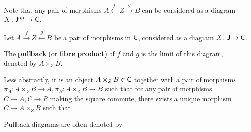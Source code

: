 \documentclass[../../main]{subfiles}
\begin{document}
Note that any pair of morphisms \(A \xleftarrow{f} Z \xrightarrow{g} B\) can be considered as a diagram \(X\colon \mathsf{J}^{\operatorname*{op}} \to \mathsf{C}\).

\begin{definition}[Pullback]\label{def:pullback}
  Let \(A \xrightarrow{f} Z \xleftarrow{g} B\) be a pair of morphisms in \(\mathsf{C}\), considered as a \hyperref[def:diagram]{diagram} \(X\colon \mathsf{J} \to \mathsf{C}\).
  
  The \textbf{pullback} (or \textbf{fibre product}) of \(f\) and \(g\) is the \hyperref[def:categorical-limit]{limit} of this \hyperref[def:diagram]{diagram}, denoted by \(A \times_{Z} B\).

  Less abstractly, it is an object \(A \times_{Z} B \in \mathsf{C}\) together with a pair of morphisms \(\pi_{A}\colon A \times_{Z} B \to A, \pi_{B}: A \times_{Z} B \to B\) such that for any pair of morphisms \(C \to A, C \to B\) making the square commute, there exists a unique morphism \(C \to A \times_{Z} B\) such that
  \begin{center}
  \end{center}

  Pullback diagrams are often denoted by
  \begin{center}
  \end{center}
\end{definition}
\end{document}
